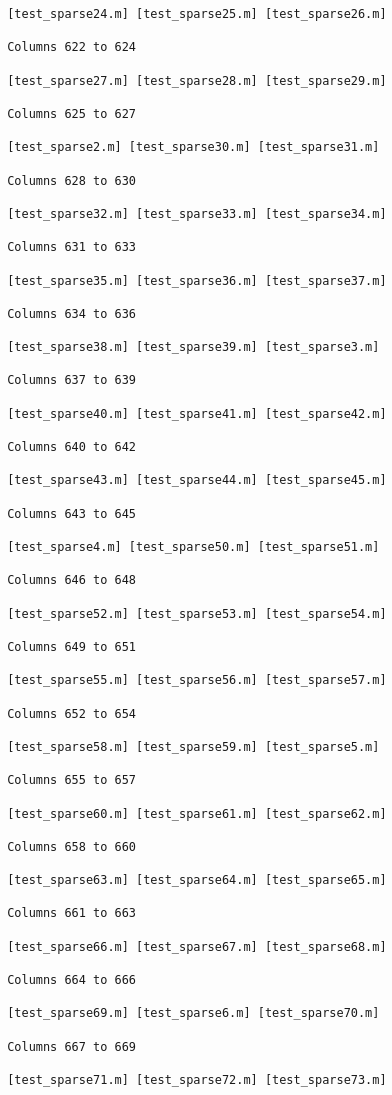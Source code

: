 \begin{verbatim}
 [test_sparse24.m] [test_sparse25.m] [test_sparse26.m] 

 Columns 622 to 624

 [test_sparse27.m] [test_sparse28.m] [test_sparse29.m] 

 Columns 625 to 627

 [test_sparse2.m] [test_sparse30.m] [test_sparse31.m] 

 Columns 628 to 630

 [test_sparse32.m] [test_sparse33.m] [test_sparse34.m] 

 Columns 631 to 633

 [test_sparse35.m] [test_sparse36.m] [test_sparse37.m] 

 Columns 634 to 636

 [test_sparse38.m] [test_sparse39.m] [test_sparse3.m] 

 Columns 637 to 639

 [test_sparse40.m] [test_sparse41.m] [test_sparse42.m] 

 Columns 640 to 642

 [test_sparse43.m] [test_sparse44.m] [test_sparse45.m] 

 Columns 643 to 645

 [test_sparse4.m] [test_sparse50.m] [test_sparse51.m] 

 Columns 646 to 648

 [test_sparse52.m] [test_sparse53.m] [test_sparse54.m] 

 Columns 649 to 651

 [test_sparse55.m] [test_sparse56.m] [test_sparse57.m] 

 Columns 652 to 654

 [test_sparse58.m] [test_sparse59.m] [test_sparse5.m] 

 Columns 655 to 657

 [test_sparse60.m] [test_sparse61.m] [test_sparse62.m] 

 Columns 658 to 660

 [test_sparse63.m] [test_sparse64.m] [test_sparse65.m] 

 Columns 661 to 663

 [test_sparse66.m] [test_sparse67.m] [test_sparse68.m] 

 Columns 664 to 666

 [test_sparse69.m] [test_sparse6.m] [test_sparse70.m] 

 Columns 667 to 669

 [test_sparse71.m] [test_sparse72.m] [test_sparse73.m] 


\end{verbatim}
